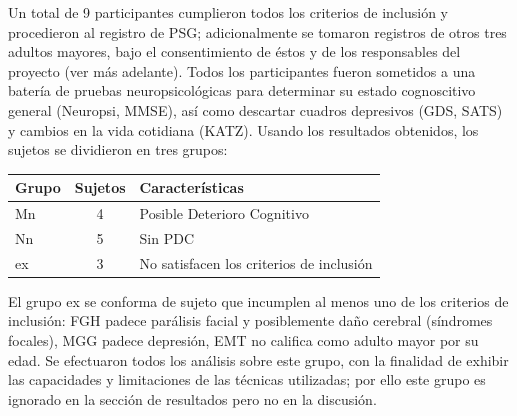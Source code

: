 Un total de 9 participantes cumplieron todos los criterios de inclusión y procedieron al registro 
de PSG; adicionalmente se tomaron registros de otros tres adultos mayores, bajo el consentimiento 
de éstos y de los responsables del proyecto (ver más adelante).
%
Todos los participantes fueron sometidos a una batería de pruebas neuropsicológicas para determinar
su estado cognoscitivo general (Neuropsi, MMSE), así como descartar cuadros depresivos (GDS, SATS) 
y cambios en la vida cotidiana (KATZ).
Usando los resultados obtenidos, los sujetos se dividieron en tres grupos:

\begin{table}[h]
\centering
\begin{tabular}{lcl}
\toprule
Grupo & Sujetos & Características \\
\midrule
Mn & 4 & Posible Deterioro Cognitivo \\
Nn & 5 & Sin PDC \\
ex & 3 & No satisfacen los criterios de inclusión \\
\bottomrule
\end{tabular}
\end{table}
%

El grupo ex se conforma de sujeto que incumplen al menos uno de los criterios de inclusión: {FGH} 
padece parálisis facial y posiblemente daño cerebral (síndromes focales), MGG padece depresión, 
EMT no califica como adulto mayor por su edad.
Se efectuaron todos los análisis sobre este grupo, con la finalidad de exhibir las capacidades y
limitaciones de las técnicas utilizadas; por ello este grupo es ignorado en la sección de 
resultados pero no en la discusión.

